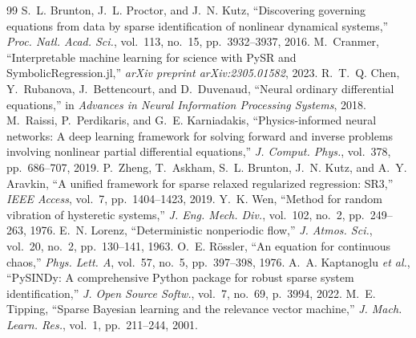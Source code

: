 \documentclass[conference]{IEEEtran}
\begin{document}

\begin{thebibliography}{99}
 S.~L. Brunton, J.~L. Proctor, and J.~N. Kutz, ``Discovering governing equations from data by sparse identification of nonlinear dynamical systems,'' \textit{Proc. Natl. Acad. Sci.}, vol.~113, no.~15, pp.~3932--3937, 2016.
 M.~Cranmer, ``Interpretable machine learning for science with PySR and SymbolicRegression.jl,'' \textit{arXiv preprint arXiv:2305.01582}, 2023.
 R.~T.~Q. Chen, Y.~Rubanova, J.~Bettencourt, and D.~Duvenaud, ``Neural ordinary differential equations,'' in \textit{Advances in Neural Information Processing Systems}, 2018.
 M.~Raissi, P.~Perdikaris, and G.~E. Karniadakis, ``Physics-informed neural networks: A deep learning framework for solving forward and inverse problems involving nonlinear partial differential equations,'' \textit{J. Comput. Phys.}, vol.~378, pp.~686--707, 2019.
 P.~Zheng, T.~Askham, S.~L. Brunton, J.~N. Kutz, and A.~Y. Aravkin, ``A unified framework for sparse relaxed regularized regression: SR3,'' \textit{IEEE Access}, vol.~7, pp.~1404--1423, 2019.
 Y.~K. Wen, ``Method for random vibration of hysteretic systems,'' \textit{J. Eng. Mech. Div.}, vol.~102, no.~2, pp.~249--263, 1976.
 E.~N. Lorenz, ``Deterministic nonperiodic flow,'' \textit{J. Atmos. Sci.}, vol.~20, no.~2, pp.~130--141, 1963.
 O.~E. R\"{o}ssler, ``An equation for continuous chaos,'' \textit{Phys. Lett. A}, vol.~57, no.~5, pp.~397--398, 1976.
 A.~A. Kaptanoglu \textit{et al.}, ``PySINDy: A comprehensive Python package for robust sparse system identification,'' \textit{J. Open Source Softw.}, vol.~7, no.~69, p.~3994, 2022.
 M.~E. Tipping, ``Sparse Bayesian learning and the relevance vector machine,'' \textit{J. Mach. Learn. Res.}, vol.~1, pp.~211--244, 2001.
\end{thebibliography}
\end{document}
